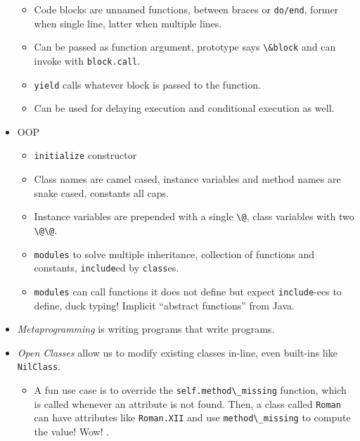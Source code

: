 \documentclass[10pt]{article}
\begin{document}
\begin{itemize}
\begin{itemize}
            \item Code blocks are unnamed functions, between braces or
                \lstinline{do/end}, former when single line, latter when multiple
                lines.
            \item Can be passed as function argument, prototype says
                \lstinline{\&block} and can invoke with \lstinline{block.call}.
            \item \lstinline{yield} calls whatever block is passed to the function.
            \item Can be used for delaying execution and conditional execution
                as well.
        \end{itemize}
    \item OOP
        \begin{itemize}
            \item \lstinline{initialize} constructor
            \item Class names are camel cased, instance variables and method
                names are snake cased, constants all caps.
            \item Instance variables are prepended with a single \lstinline{\@},
                class variables with two \lstinline{\@\@}.
            \item \lstinline{modules} to solve multiple inheritance, collection of
                functions and constants, \lstinline{include}ed by \lstinline{class}es.
            \item \lstinline{modules} can call functions it does not define but
                expect \lstinline{include}-ees to define, duck typing! Implicit
                ``abstract functions'' from Java.
        \end{itemize}
    \item \emph{Metaprogramming} is writing programs that write programs.
    \item \emph{Open Classes} allow us to modify existing classes in-line, even
        built-ins like \lstinline{NilClass}.
        \begin{itemize}
            \item A fun use case is to override the
                \lstinline{self.method\_missing} function, which is called whenever
                an attribute is not found. Then, a class called \lstinline{Roman}
                can have attributes like \lstinline{Roman.XII} and use
                \lstinline{method\_missing} to compute the value! Wow! \smiley.
        \end{itemize}

\end{itemize}
\end{document}
